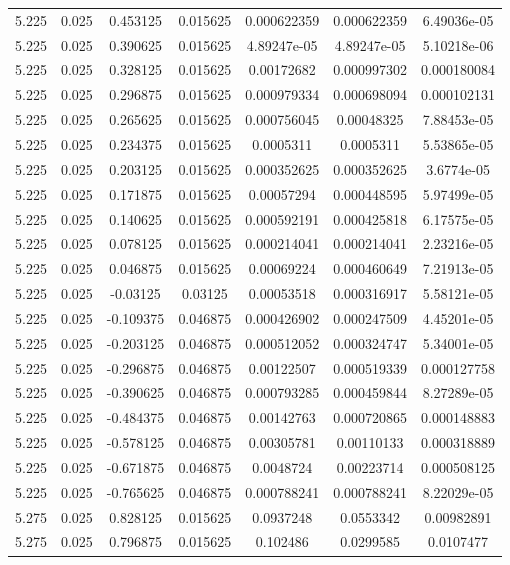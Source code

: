 \begin{flushleft}
\begin{longtable}{ccccccc}
5.225 & 0.025 & 0.453125 & 0.015625 & 0.000622359 & 0.000622359 & 6.49036e-05  \\ 
5.225 & 0.025 & 0.390625 & 0.015625 & 4.89247e-05 & 4.89247e-05 & 5.10218e-06  \\ 
5.225 & 0.025 & 0.328125 & 0.015625 & 0.00172682 & 0.000997302 & 0.000180084  \\ 
5.225 & 0.025 & 0.296875 & 0.015625 & 0.000979334 & 0.000698094 & 0.000102131  \\ 
5.225 & 0.025 & 0.265625 & 0.015625 & 0.000756045 & 0.00048325 & 7.88453e-05  \\ 
5.225 & 0.025 & 0.234375 & 0.015625 & 0.0005311 & 0.0005311 & 5.53865e-05  \\ 
5.225 & 0.025 & 0.203125 & 0.015625 & 0.000352625 & 0.000352625 & 3.6774e-05  \\ 
5.225 & 0.025 & 0.171875 & 0.015625 & 0.00057294 & 0.000448595 & 5.97499e-05  \\ 
5.225 & 0.025 & 0.140625 & 0.015625 & 0.000592191 & 0.000425818 & 6.17575e-05  \\ 
5.225 & 0.025 & 0.078125 & 0.015625 & 0.000214041 & 0.000214041 & 2.23216e-05  \\ 
5.225 & 0.025 & 0.046875 & 0.015625 & 0.00069224 & 0.000460649 & 7.21913e-05  \\ 
5.225 & 0.025 & -0.03125 & 0.03125 & 0.00053518 & 0.000316917 & 5.58121e-05  \\ 
5.225 & 0.025 & -0.109375 & 0.046875 & 0.000426902 & 0.000247509 & 4.45201e-05  \\ 
5.225 & 0.025 & -0.203125 & 0.046875 & 0.000512052 & 0.000324747 & 5.34001e-05  \\ 
5.225 & 0.025 & -0.296875 & 0.046875 & 0.00122507 & 0.000519339 & 0.000127758  \\ 
5.225 & 0.025 & -0.390625 & 0.046875 & 0.000793285 & 0.000459844 & 8.27289e-05  \\ 
5.225 & 0.025 & -0.484375 & 0.046875 & 0.00142763 & 0.000720865 & 0.000148883  \\ 
5.225 & 0.025 & -0.578125 & 0.046875 & 0.00305781 & 0.00110133 & 0.000318889  \\ 
5.225 & 0.025 & -0.671875 & 0.046875 & 0.0048724 & 0.00223714 & 0.000508125  \\ 
5.225 & 0.025 & -0.765625 & 0.046875 & 0.000788241 & 0.000788241 & 8.22029e-05  \\ 
5.275 & 0.025 & 0.828125 & 0.015625 & 0.0937248 & 0.0553342 & 0.00982891  \\ 
5.275 & 0.025 & 0.796875 & 0.015625 & 0.102486 & 0.0299585 & 0.0107477  \\ 

\end{longtable}
\end{flushleft}
